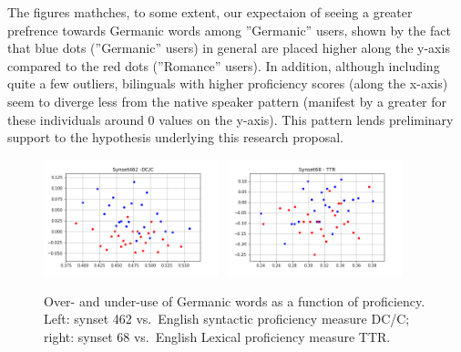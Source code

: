 \documentclass[11pt]{article}
\begin{document}
The figures mathches, to some extent, our expectaion of seeing a greater prefrence towards Germanic words among ''Germanic'' users, shown by the fact that blue dots (''Germanic'' users) in general are placed higher along the y-axis compared to the red dots (''Romance'' users). In addition, although including quite a few outliers, bilinguals with higher proficiency scores (along the x-axis) seem to diverge less from the native speaker pattern (manifest by a greater for these individuals around 0 values on the y-axis). This pattern lends preliminary support to the hypothesis underlying this research proposal.

\begin{figure} [bt]
\begin{center}
\includegraphics[width=0.45\textwidth]{images/462-DC-C.png}		
\ 		
\includegraphics[width=0.45\textwidth]{images/68-TTR.png}		
\end{center}
\caption{Over- and under-use of Germanic words as a function of proficiency. Left: synset 462 vs.\ English syntactic proficiency measure DC/C; right: synset 68 vs.\ English Lexical proficiency measure TTR.}
\label{fig:results}	
\end{figure}








\end{document}
